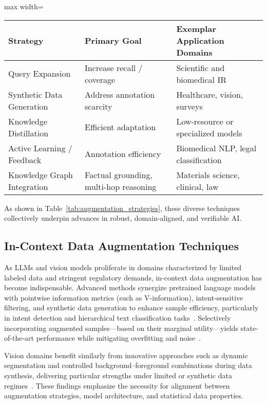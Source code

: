 \begin{table*}[htbp]
\centering
\caption{Representative Knowledge and Context Augmentation Strategies}
\label{tab:augmentation_strategies}
\begin{adjustbox}{max width=\textwidth}
\begin{tabular}{lll}
\toprule
\textbf{Strategy} & \textbf{Primary Goal} & \textbf{Exemplar Application Domains} \\
\midrule
Query Expansion         & Increase recall / coverage   & Scientific and biomedical IR \\
Synthetic Data Generation & Address annotation scarcity & Healthcare, vision, surveys \\
Knowledge Distillation  & Efficient adaptation        & Low-resource or specialized models \\
Active Learning / Feedback & Annotation efficiency        & Biomedical NLP, legal classification \\
Knowledge Graph Integration & Factual grounding, multi-hop reasoning & Materials science, clinical, law \\
\bottomrule
\end{tabular}
\end{adjustbox}
\end{table*}

As shown in Table~\ref{tab:augmentation_strategies}, these diverse techniques collectively underpin advances in robust, domain-aligned, and verifiable AI.

\subsection{In-Context Data Augmentation Techniques}

As LLMs and vision models proliferate in domains characterized by limited labeled data and stringent regulatory demands, in-context data augmentation has become indispensable. Advanced methods synergize pretrained language models with pointwise information metrics (such as V-information), intent-sensitive filtering, and synthetic data generation to enhance sample efficiency, particularly in intent detection and hierarchical text classification tasks~\cite{ref61}. Selectively incorporating augmented samples—based on their marginal utility—yields state-of-the-art performance while mitigating overfitting and noise~\cite{ref61}.

Vision domains benefit similarly from innovative approaches such as dynamic segmentation and controlled background–foreground combinations during data synthesis, delivering particular strengths under limited or synthetic data regimes~\cite{ref62}. These findings emphasize the necessity for alignment between augmentation strategies, model architecture, and statistical data properties.

